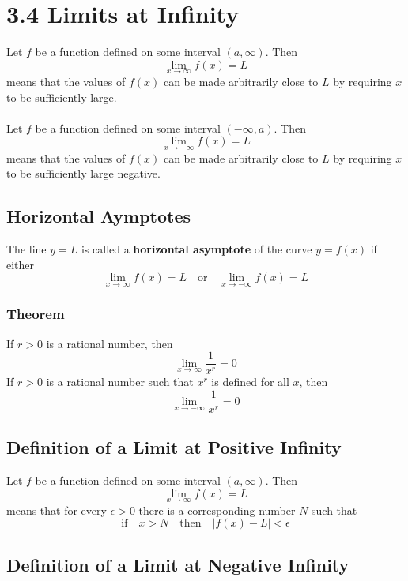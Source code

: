 %
%

\section*{3.4 Limits at Infinity}

Let \(f\) be a function defined on some interval \((a, \infty)\). Then
$$ \lim_{x \to \infty}f(x) = L $$
means that the values of \(f(x)\) can be made arbitrarily close to \(L\) by requiring \(x\) to be sufficiently large.
\\\\
Let \(f\) be a function defined on some interval \((-\infty, a)\). Then
$$ \lim_{x \to -\infty}f(x) = L $$
means that the values of \(f(x)\) can be made arbitrarily close to \(L\) by requiring \(x\) to be sufficiently large negative.

\subsection*{Horizontal Aymptotes}

The line \(y=L\) is called a \textbf{horizontal asymptote} of the curve \(y=f(x)\) if either
$$\lim_{x \to \infty}f(x)=L \quad \text{or} \quad \lim_{x \to -\infty}f(x)=L$$

\subsubsection*{Theorem}

If \(r>0\) is a rational number, then
$$ \lim_{x \to \infty}\frac{1}{x^r}=0 $$
If \(r>0\) is a rational number such that \(x^r\) is defined for all \(x\), then
$$ \lim_{x \to -\infty}\frac{1}{x^r}=0 $$

\subsection*{Definition of a Limit at Positive Infinity}

Let \(f\) be a function defined on some interval \((a, \infty)\). Then
$$ \lim_{x \to \infty}f(x)=L$$
means that for every \(\epsilon>0\) there is a corresponding number \(N\) such that 
$$ \text{if} \quad x>N \quad \text{then} \quad |f(x)-L|<\epsilon $$ 

\subsection*{Definition of a Limit at Negative Infinity}

